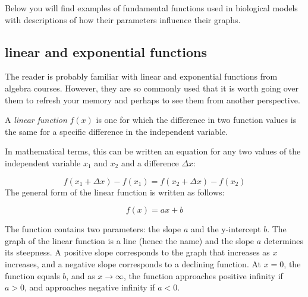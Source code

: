 \documentclass[
  letterpaper,
  DIV=11,
  numbers=noendperiod]{scrreprt}
\begin{document}
Below you will find examples of fundamental functions used in biological
models with descriptions of how their parameters influence their graphs.

\hypertarget{linear-and-exponential-functions}{%
\subsection{linear and exponential
functions}\label{linear-and-exponential-functions}}

The reader is probably familiar with linear and exponential functions
from algebra courses. However, they are so commonly used that it is
worth going over them to refresh your memory and perhaps to see them
from another perspective.

\begin{tcolorbox}[enhanced jigsaw, coltitle=black, arc=.35mm, opacitybacktitle=0.6, breakable, bottomtitle=1mm, toptitle=1mm, titlerule=0mm, colback=white, leftrule=.75mm, rightrule=.15mm, colframe=quarto-callout-note-color-frame, colbacktitle=quarto-callout-note-color!10!white, opacityback=0, title=\textcolor{quarto-callout-note-color}{\faInfo}\hspace{0.5em}{Definition}, left=2mm, toprule=.15mm, bottomrule=.15mm]

A \emph{linear function} \(f(x)\) is one for which the difference in two
function values is the same for a specific difference in the independent
variable.

\end{tcolorbox}

In mathematical terms, this can be written an equation for any two
values of the independent variable \(x_1\) and \(x_2\) and a difference
\(\Delta x\):

\[ f(x_1 + \Delta x) - f(x_1) = f(x_2 + \Delta x) - f(x_2) \] The
general form of the linear function is written as follows:

\begin{equation}
f(x) = ax + b
\label{eq:linear_funk}
\end{equation}

The function contains two parameters: the
 slope \(a\) and the
 y-intercept \(b\). The graph of the
linear function is a line (hence the name) and the slope \(a\)
determines its steepness. A positive slope corresponds to the graph that
increases as \(x\) increases, and a negative slope corresponds to a
declining function. At \(x=0\), the function equals \(b\), and as
\(x \to \infty\), the function approaches positive infinity if \(a>0\),
and approaches negative infinity if \(a<0\).
\end{document}
